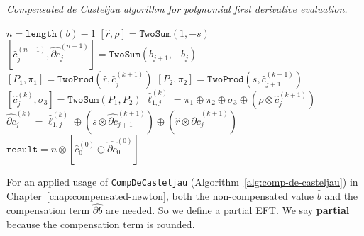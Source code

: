 \begin{breakablealgorithm}
  \caption{\textit{Compensated de Casteljau
      algorithm for polynomial first derivative evaluation.}}
  \label{alg:comp-de-casteljau-derivative}

  \begin{algorithmic}
      \State \(n = \texttt{length}(b) - 1\)
      \State \(\left[\widehat{r}, \rho\right] = \mathtt{TwoSum}(1, -s)\)
      \\
        \State \(\left[\widehat{c}_j^{(n - 1)},
          \widehat{\partial c}_j^{(n - 1)}\right] =
          \mathtt{TwoSum}(b_{j + 1}, -b_j)\)
      \EndFor
      \\
          \State \(\left[P_1, \pi_1\right] = \mathtt{TwoProd}\left(
              \widehat{r}, \widehat{c}_j^{(k + 1)}\right)\)
          \State \(\left[P_2, \pi_2\right] = \mathtt{TwoProd}\left(
              s, \widehat{c}_{j + 1}^{(k + 1)}\right)\)
          \State \(\left[\widehat{c}_j^{(k)}, \sigma_3\right] =
              \mathtt{TwoSum}(P_1, P_2)\)
          \State \(\widehat{\ell}_{1, j}^{(k)} = \pi_1 \oplus \pi_2 \oplus
              \sigma_3 \oplus \left(\rho \otimes
              \widehat{c}_j^{(k + 1)}\right)\)
          \State \(\widehat{\partial c}_j^{(k)} =
              \widehat{\ell}_{1, j}^{(k)} \oplus
              \left(s \otimes \widehat{\partial c}_{j + 1}^{(k + 1)}
              \right) \oplus
              \left(\widehat{r} \otimes
              \widehat{\partial c}_j^{(k + 1)}\right)\)
        \EndFor
      \EndFor
      \\
      \State \(\mathtt{result} = n \otimes \left[\widehat{c}_0^{(0)} \oplus
          \widehat{\partial c}_0^{(0)}\right]\)
    \EndFunction
  \end{algorithmic}
\end{breakablealgorithm}

For an applied usage of \texttt{CompDeCasteljau}
(Algorithm~\ref{alg:comp-de-casteljau}) in
Chapter~\ref{chap:compensated-newton}, both the non-compensated
value \(\widehat{b}\) and the compensation term \(\widehat{\partial b}\) are
needed. So we define a partial EFT. We say \textbf{partial} because
the compensation term is rounded.

